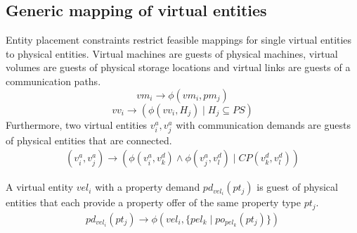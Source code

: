 \documentclass[conference]{IEEEtran}
\begin{document}
\subsection{Generic mapping of virtual entities}

Entity placement constraints restrict feasible mappings for single virtual entities to physical entities.
Virtual machines are guests of physical machines, virtual volumes are guests of physical storage locations and virtual links are guests of a communication paths.   
\begin{equation}
vm_i \rightarrow \phi(vm_i, pm_j)
\end{equation}
\begin{equation}
vv_i \rightarrow (\phi(vv_i, H_j) \mid H_j \subseteq PS)
\end{equation}
Furthermore, two virtual entities $v^{a}_i, v^{a}_j$ with communication demands are guests of physical entities that are connected.
\begin{multline}
(v^{a}_i, v^{a}_j) \rightarrow (\phi(v^{a}_i, v^{d}_k) \wedge \phi(v^{a}_j, v^{d}_l) \mid CP(v^{d}_k, v^{d}_l)) 
\end{multline}

A virtual entity $vel_i$ with a property demand $pd_{vel_i}(pt_j)$ is guest of physical entities that each provide a property offer of the same property type $pt_j$.
\begin{multline}
pd_{vel_i}(pt_j) \rightarrow \phi(vel_i, \{ pel_k \mid po_{pel_k}(pt_j) \})
\end{multline}
\end{document}
